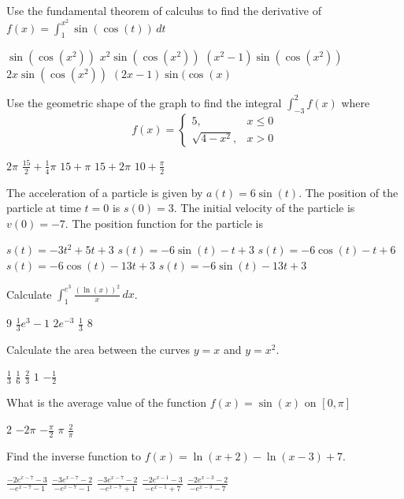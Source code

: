 \documentclass[11pt]{article}
\begin{document}
\begin{questions}
\begin{multiplechoice}{5}
\newpage

\question Use the fundamental theorem of calculus to find the derivative of 
$\displaystyle f(x) = \int_1^{x^2} \sin(\cos(t)) \, dt$
\begin{answers}{2}
\ans $\sin(\cos(x^2))$
\ans $x^2 \sin(\cos(x^2))$
\ans $(x^2 - 1) \sin(\cos(x^2))$
\ans $2x \sin(\cos(x^2))$
\ans $(2x - 1) \sin(\cos(x)$
\end{answers}

\question Use the geometric shape of the graph to find the integral 
$\displaystyle \int_{-3}^2 f(x)$ where 
$$ f(x) = 
\begin{cases}
5, & x \le 0 \\
\sqrt{4 - x^2}, & x > 0
\end{cases}
$$
\begin{answers}{2}
\ans $2\pi$
\ans $\frac{15}{2} + \frac{1}{4}\pi$
\ans $15 + \pi$
\ans $15 + 2\pi$
\ans $10  + \frac{\pi}{2}$
\end{answers}

\question The acceleration of a particle is given by $a(t) = 6\sin(t)$.  The position
of the particle at time $t = 0$ is $s(0) = 3$.  The initial velocity of the particle is $v(0) = -7$.
The position function for the particle is
\begin{answers}{2}
\ans $s(t) = -3t^2 + 5t + 3$ 
\ans $s(t) = -6 \sin(t) -t + 3$
\ans $s(t) = -6 \cos(t) -t + 6$
\ans $s(t) = -6 \cos(t) - 13t + 3$
\ans $s(t) = -6 \sin(t) - 13t + 3$
\end{answers}

\question Calculate $\int_1^{e^3} \frac{(\ln(x))^2}{x} \, dx$.
\begin{answers}{2}
\ans $9$ 
\ans $\frac{1}{3} e^{3} - 1$
\ans $2e^{-3}$
\ans $\frac{1}{3}$
\ans $8$
\end{answers}

\question Calculate the area between the curves $y = x$ and $y = x^2$.
\begin{answers}{3}
\ans $\frac 1 3$ 
\ans $\frac 1 6$ 
\ans $\frac 2 3$ 
\ans $1$ 
\ans $- \frac 1 2$ 
\end{answers}

\question What is the average value of the function $f(x) = \sin(x)$ on $[0, \pi]$
\begin{answers}{3}
\ans $2$
\ans $-2\pi$
\ans $-\frac{\pi}{2}$
\ans $\pi$
\ans $\frac{2}{\pi}$
\end{answers}


\question Find the inverse function to $f(x) = \ln(x+2) - \ln(x-3) + 7$.
\begin{answers}{2}
\ans $\frac{-2e^{x-7} - 3}{-e^{x-7} - 1}$
\ans $\frac{-3e^{x-7} - 2}{-e^{x-7} - 1}$
\ans $\frac{-3e^{x-7} - 2}{-e^{x-7} + 1}$
\ans $\frac{-2e^{x-1} - 3}{-e^{x-1} + 7}$
\ans $\frac{-2e^{x-3} - 2}{-e^{x-3} - 7}$
\end{answers}

\end{multiplechoice}
\end{questions}
\end{document}
